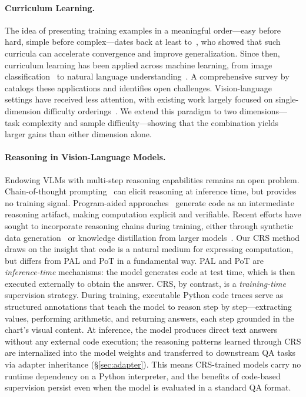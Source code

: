 \documentclass[journal]{IEEEtran}
\newcommand{\crs}{CRS}
\begin{document}
\paragraph{Curriculum Learning.}
The idea of presenting training examples in a meaningful order---easy before hard, simple before complex---dates back at least to~\cite{bengio2009curriculum}, who showed that such curricula can accelerate convergence and improve generalization. Since then, curriculum learning has been applied across machine learning, from image classification~\cite{hacohen2019power} to natural language understanding~\cite{xu2020curriculum}. A comprehensive survey by~\cite{soviany2022curriculum} catalogs these applications and identifies open challenges. Vision-language settings have received less attention, with existing work largely focused on single-dimension difficulty orderings~\cite{shen2021much}. We extend this paradigm to two dimensions---task complexity and sample difficulty---showing that the combination yields larger gains than either dimension alone.

\paragraph{Reasoning in Vision-Language Models.}
Endowing VLMs with multi-step reasoning capabilities remains an open problem. Chain-of-thought prompting~\cite{wei2022chain} can elicit reasoning at inference time, but provides no training signal. Program-aided approaches~\cite{gao2023pal,chen2022program} generate code as an intermediate reasoning artifact, making computation explicit and verifiable. Recent efforts have sought to incorporate reasoning chains during training, either through synthetic data generation~\cite{lu2024mathvista} or knowledge distillation from larger models~\cite{shao2024visual}. Our \crs{} method draws on the insight that code is a natural medium for expressing computation, but differs from PAL and PoT in a fundamental way. PAL and PoT are \emph{inference-time} mechanisms: the model generates code at test time, which is then executed externally to obtain the answer. \crs{}, by contrast, is a \emph{training-time} supervision strategy. During training, executable Python code traces serve as structured annotations that teach the model to reason step by step---extracting values, performing arithmetic, and returning answers, each step grounded in the chart's visual content. At inference, the model produces direct text answers without any external code execution; the reasoning patterns learned through \crs{} are internalized into the model weights and transferred to downstream QA tasks via adapter inheritance (\S\ref{sec:adapter}). This means \crs{}-trained models carry no runtime dependency on a Python interpreter, and the benefits of code-based supervision persist even when the model is evaluated in a standard QA format.
\end{document}
